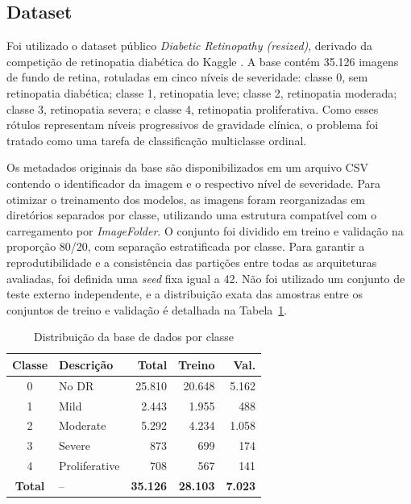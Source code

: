 \documentclass[conference]{IEEEtran}
\begin{document}
\subsection{Dataset}

Foi utilizado o dataset público \textit{Diabetic Retinopathy
(resized)}\cite{dataset}, derivado da competição de retinopatia
diabética do Kaggle \cite{APTOS2019}. A base contém 35.126 imagens
de fundo de retina, rotuladas em cinco níveis de severidade: classe 0,
sem retinopatia diabética; classe 1, retinopatia leve; classe 2,
retinopatia moderada; classe 3, retinopatia severa; e classe 4,
retinopatia proliferativa. Como esses rótulos representam níveis
progressivos de gravidade clínica, o problema foi tratado como uma
tarefa de classificação multiclasse ordinal.

Os metadados originais da base são disponibilizados em um arquivo CSV
contendo o identificador da imagem e o respectivo nível de severidade.
Para otimizar o treinamento dos modelos, as imagens foram reorganizadas
em diretórios separados por classe, utilizando uma estrutura compatível
com o carregamento por \textit{ImageFolder}. O conjunto foi dividido em
treino e validação na proporção 80/20, com separação
estratificada por classe. Para garantir a reprodutibilidade e a consistência das partições entre todas as arquiteturas avaliadas, foi definida uma \textit{seed} fixa igual a 42. Não foi utilizado um conjunto de teste externo independente, e a distribuição exata das amostras entre os conjuntos de treino e validação é detalhada na Tabela~\ref{tab:distribuicao_base}.

\begin{table}[htbp]
\caption{Distribuição da base de dados por classe}
\label{tab:distribuicao_base}
\centering
\scriptsize
\begin{tabular}{c l r r r}
\hline
\textbf{Classe} & \textbf{Descrição} & \textbf{Total} &
\textbf{Treino} & \textbf{Val.} \\
\hline
0 & No DR         & 25.810 & 20.648 & 5.162 \\
1 & Mild          &  2.443 &  1.955 &   488 \\
2 & Moderate      &  5.292 &  4.234 & 1.058 \\
3 & Severe        &    873 &    699 &   174 \\
4 & Proliferative &    708 &    567 &   141 \\
\hline
\textbf{Total} & -- & \textbf{35.126} & \textbf{28.103} & \textbf{7.023} \\
\hline
\end{tabular}
\end{table}
\end{document}
